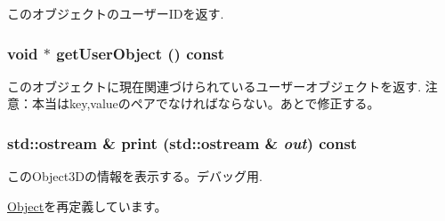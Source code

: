 このオブジェクトのユーザーIDを返す. \hypertarget{classm3g_1_1Object3D_a9b8541216c1fa7792617218a5fb6672}{
\subsubsection[{getUserObject}]{\setlength{\rightskip}{0pt plus 5cm}void $\ast$ getUserObject () const}}
\label{classm3g_1_1Object3D_a9b8541216c1fa7792617218a5fb6672}


このオブジェクトに現在関連づけられているユーザーオブジェクトを返す. 注意：本当はkey,valueのペアでなければならない。あとで修正する。 \hypertarget{classm3g_1_1Object3D_6fea17fa1532df3794f8cb39cb4f911f}{
\subsubsection[{print}]{\setlength{\rightskip}{0pt plus 5cm}std::ostream \& print (std::ostream \& {\em out}) const}}
\label{classm3g_1_1Object3D_6fea17fa1532df3794f8cb39cb4f911f}


このObject3Dの情報を表示する。デバッグ用. 

\hyperlink{classm3g_1_1Object_6fea17fa1532df3794f8cb39cb4f911f}{Object}を再定義しています。

